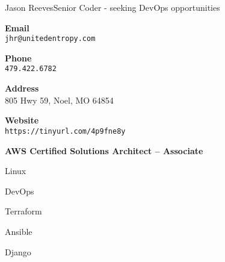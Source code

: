 \documentclass{article}
\begin{document}
\raggedbottom
\begin{cv}[avatar]{Jason Reeves}{Senior Coder - seeking DevOps opportunities}
\cvsidebar %



\begin{cvitem}[Envelope][4]
    \textbf{Email}\\
    \texttt{jhr@unitedentropy.com}
\end{cvitem}

\cvseparator[3]
\begin{cvitem}[Phone][4]
    \textbf{Phone}\\
    \texttt{479.422.6782}
\end{cvitem}

\cvseparator[3]
\begin{cvitem}[Home][4]
    \textbf{Address}\\
    805 Hwy 59, Noel, MO  64854
\end{cvitem}

\cvseparator[3]
\begin{cvitem}[Globe][4]
    \textbf{Website}\\
    \texttt{https://tinyurl.com/4p9fne8y}
\end{cvitem}


\begin{cvitem}
  \footnotesize \textbf{AWS Certified Solutions Architect – Associate}
\end{cvitem}

\cvseparator
\begin{cvitem}
  \footnotesize Linux
\end{cvitem}

\cvseparator
\begin{cvitem}
  \footnotesize DevOps
\end{cvitem}

\cvseparator
\begin{cvitem}
  \footnotesize Terraform
\end{cvitem}

\cvseparator
\begin{cvitem}
  \footnotesize Ansible
\end{cvitem}

\cvseparator
\begin{cvitem}
  \footnotesize Django
\end{cvitem}


\end{cv}
\end{document}
